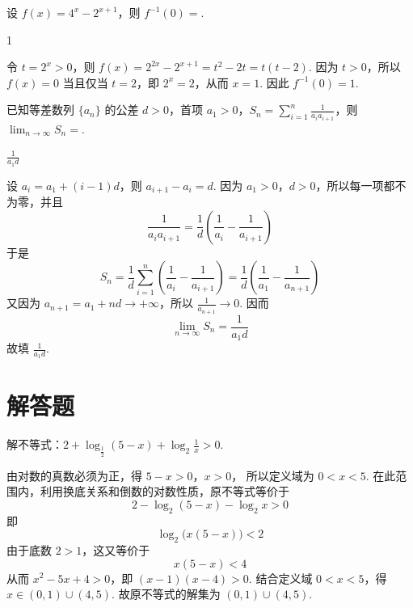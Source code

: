 \begin{problem}
设 \(f(x) = 4^{x} - 2^{x + 1}\)，则 \(f^{-1}(0) =\)\fillinblank{}.
\end{problem}

\begin{answer}
1
\end{answer}

\begin{solution}
令 \(t=2^x>0\)，则
\(f(x)=2^{2x}-2^{x+1}=t^2-2t=t(t-2)\). 因为 \(t>0\)，所以
\(f(x)=0\) 当且仅当 \(t=2\)，即 \(2^x=2\)，从而 \(x=1\). 因此
\(f^{-1}(0)=1\).
\end{solution}

\begin{problem}
已知等差数列 \(\{a_{n}\}\) 的公差 \(d > 0\)，首项 \(a_{1} > 0\)，\(S_{n} = \sum_{i=1}^{n} \frac{1}{a_{i} a_{i+1}}\)，则 \(\displaystyle\lim_{n \to \infty} S_{n} =\)\fillinblank{}.
\end{problem}

\begin{answer}
\(\frac{1}{a_1d}\)
\end{answer}

\begin{solution}
设 \(a_i=a_1+(i-1)d\)，则 \(a_{i+1}-a_i=d\). 因为 \(a_1>0\)，\(d>0\)，所以每一项都不为零，并且
\[
\frac{1}{a_i a_{i+1}}=\frac{1}{d}\left(\frac{1}{a_i}-\frac{1}{a_{i+1}}\right)
\]
于是
\[
S_n=\frac{1}{d}\sum_{i=1}^{n}\left(\frac{1}{a_i}-\frac{1}{a_{i+1}}\right)=\frac{1}{d}\left(\frac{1}{a_1}-\frac{1}{a_{n+1}}\right)
\]
又因为 \(a_{n+1}=a_1+nd\to+\infty\)，所以 \(\frac{1}{a_{n+1}}\to0\). 因而
\[
\lim_{n\to\infty}S_n=\frac{1}{a_1d}
\]
故填 \(\frac{1}{a_1d}\).
\end{solution}

\section{解答题}

\begin{problem}
解不等式：\(2 + \log_{\frac{1}{2}}(5 - x) + \log_{2}\frac{1}{x} > 0\).
\end{problem}

\begin{solution}
由对数的真数必须为正，得 \(5-x>0\)，\(x>0\)，
所以定义域为 \(0<x<5\). 在此范围内，利用换底关系和倒数的对数性质，原不等式等价于
\[
2-\log_{2}(5-x)-\log_{2}x>0
\]
即
\[
\log_{2}\bigl(x(5-x)\bigr)<2
\]
由于底数 \(2>1\)，这又等价于
\[
x(5-x)<4
\]
从而 \(x^2-5x+4>0\)，即 \((x-1)(x-4)>0\). 结合定义域
\(0<x<5\)，得 \(x\in(0,1)\cup(4,5)\).
故原不等式的解集为 \((0,1)\cup(4,5)\).
\end{solution}

